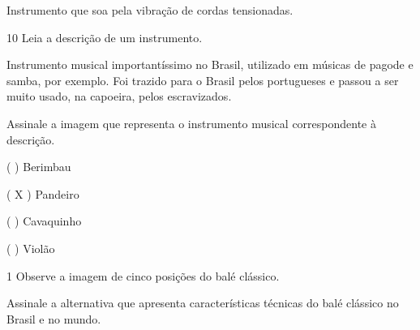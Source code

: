 \begin{escolha}
\begin{boxlist}
 Instrumento que soa pela vibração de cordas tensionadas.
\end{boxlist}


\num{10} Leia a descrição de um instrumento.

Instrumento musical importantíssimo no Brasil, utilizado em músicas
de pagode e samba, por exemplo. Foi trazido para o Brasil pelos portugueses
e passou a ser muito usado, na capoeira, pelos escravizados.

Assinale a imagem que representa o instrumento musical correspondente à descrição.

( )
Berimbau


( X )
Pandeiro

( )
Cavaquinho


( )
Violão



\num{1} Observe a imagem de cinco posições do balé clássico.

%
%
%
%
%
%
%
%


Assinale a alternativa que apresenta características técnicas do balé
clássico no Brasil e no mundo.


\end{escolha}
